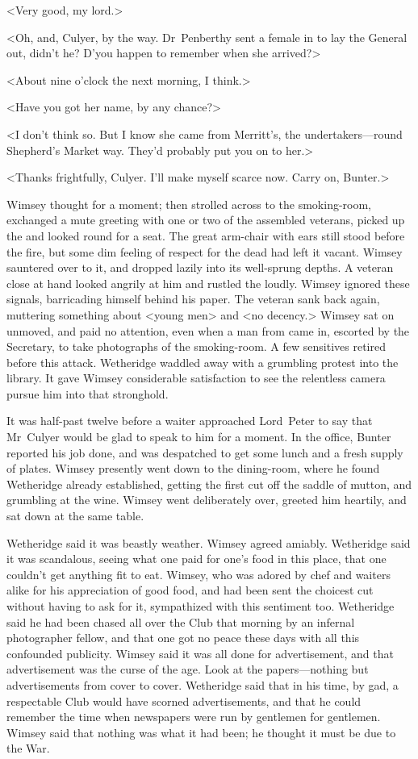 <Very good, my lord.>

<Oh, and, Culyer, by the way. Dr~Penberthy sent a female in to lay the General out, didn't he? D'you happen to remember when she arrived?>

<About nine o'clock the next morning, I think.>

<Have you got her name, by any chance?>

<I don't think so. But I know she came from Merritt's, the undertakers—round Shepherd's Market way. They'd probably put you on to her.>

<Thanks frightfully, Culyer. I'll make myself scarce now. Carry on, Bunter.>

Wimsey thought for a moment; then strolled across to the smoking-room, exchanged a mute greeting with one or two of the assembled veterans, picked up the  and looked round for a seat. The great arm-chair with ears still stood before the fire, but some dim feeling of respect for the dead had left it vacant. Wimsey sauntered over to it, and dropped lazily into its well-sprung depths. A veteran close at hand looked angrily at him and rustled the  loudly. Wimsey ignored these signals, barricading himself behind his paper. The veteran sank back again, muttering something about <young men> and <no decency.> Wimsey sat on unmoved, and paid no attention, even when a man from  came in, escorted by the Secretary, to take photographs of the smoking-room. A few sensitives retired before this attack. Wetheridge waddled away with a grumbling protest into the library. It gave Wimsey considerable satisfaction to see the relentless camera pursue him into that stronghold.

It was half-past twelve before a waiter approached Lord~Peter to say that Mr~Culyer would be glad to speak to him for a moment. In the office, Bunter reported his job done, and was despatched to get some lunch and a fresh supply of plates. Wimsey presently went down to the dining-room, where he found Wetheridge already established, getting the first cut off the saddle of mutton, and grumbling at the wine. Wimsey went deliberately over, greeted him heartily, and sat down at the same table.

Wetheridge said it was beastly weather. Wimsey agreed amiably. Wetheridge said it was scandalous, seeing what one paid for one's food in this place, that one couldn't get anything fit to eat. Wimsey, who was adored by chef and waiters alike for his appreciation of good food, and had been sent the choicest cut without having to ask for it, sympathized with this sentiment too. Wetheridge said he had been chased all over the Club that morning by an infernal photographer fellow, and that one got no peace these days with all this confounded publicity. Wimsey said it was all done for advertisement, and that advertisement was the curse of the age. Look at the papers—nothing but advertisements from cover to cover. Wetheridge said that in his time, by gad, a respectable Club would have scorned advertisements, and that he could remember the time when newspapers were run by gentlemen for gentlemen. Wimsey said that nothing was what it had been; he thought it must be due to the War.

